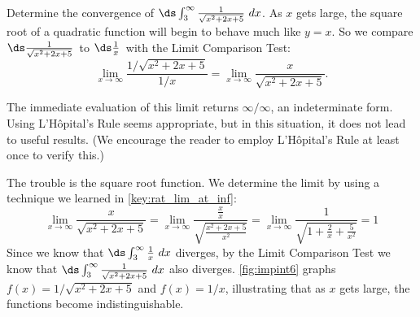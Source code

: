 \begin{example}\label{ex_impint6}
Determine the convergence of $\ds \int_3^{\infty} \frac{1}{\sqrt{x^2+2x+5}}\ dx$.
\solution
As $x$ gets large, the square root of a quadratic function will begin to behave much like $y=x$. So we compare \small$\ds\frac{1}{\sqrt{x^2+2x+5}}$\normalsize\ to \small$\ds\frac1x$\normalsize\ with the Limit Comparison Test:
\[
\lim_{x\to\infty} \frac{1/\sqrt{x^2+2x+5}}{1/x}
= \lim_{x\to\infty}\frac{x}{\sqrt{x^2+2x+5}}.
\]

The immediate evaluation of this limit returns $\infty/\infty$, an indeterminate form. Using L'Hôpital's Rule seems appropriate, but in this situation, it does not lead to useful results. (We encourage the reader to employ L'Hôpital's Rule at least once to verify this.)

The trouble is the square root function.
We determine the limit by using a technique we learned in \autoref{key:rat_lim_at_inf}:
%
%
\[
 \lim_{x\to\infty}\frac x{\sqrt{x^2+2x+5}}
 =\lim_{x\to\infty}\frac{\frac xx}{\sqrt{\frac{x^2+2x+5}{x^2}}}
 =\lim_{x\to\infty}\frac1{\sqrt{1+\frac2x+\frac5{x^2}}}=1
\]
Since we know that $\ds\int_3^{\infty} \tfrac1x\ dx$ diverges, by the Limit Comparison Test we know that $\ds\int_3^\infty\tfrac1{\sqrt{x^2+2x+5}}\ dx$ also diverges. \autoref{fig:impint6} graphs $f(x)=1/\sqrt{x^2+2x+5}$ and $f(x)=1/x$, illustrating that as $x$ gets large, the functions become indistinguishable.
\end{example}


